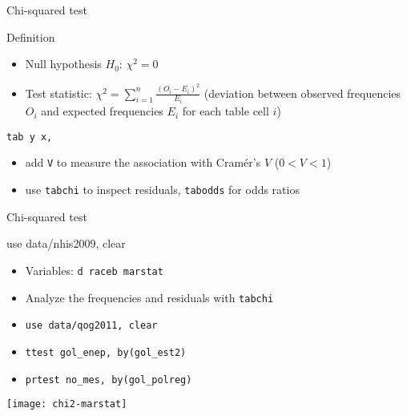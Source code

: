 \documentclass[t]{beamer}
\begin{document}
	\begin{frame}{Chi-squared test}
		
		
		\begin{block}{Definition}
		
			\begin{itemize}
				\item Null hypothesis $H_0$:
				$\chi^2=0$
			
				\item Test statistic:
				$\chi^2=\sum_{i=1}^{n} \frac{(O_i - E_i)^2}{E_i}$ (deviation between observed frequencies $O_i$ and expected frequencies $E_i$ for each table cell $i$)
				
			\end{itemize}

		\end{block}
		
		\begin{block}{\texttt{tab y x, }}

			\begin{itemize}
				\item add \texttt{V} to measure the association with Cramér's $V$ ($0 < V < 1$)
				\item use \texttt{tabchi} to inspect residuals, \texttt{tabodds} for odds ratios
			\end{itemize}

		\end{block}
		
	\end{frame}
	
	\begin{frame}[t]{Chi-squared test}
		
		\begin{exampleblock}{use data/nhis2009, clear}
		
			\begin{itemize}
				\item Variables: \texttt{d raceb marstat}
							
				\item Analyze the frequencies and residuals with \texttt{tabchi}
								
				\item \texttt{use data/qog2011, clear}
				\item \texttt{ttest gol\_enep, by(gol\_est2)}
				\item \texttt{prtest no\_mes, by(gol\_polreg)}
			
			\end{itemize}

		\end{exampleblock}
		
		\begin{center}
			\texttt{[image: chi2-marstat]}
		\end{center}
		
	\end{frame}
	
\end{document}
